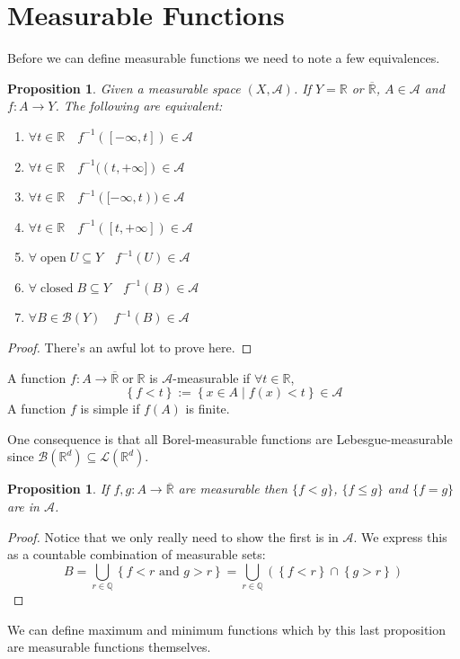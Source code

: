 \documentclass[11pt]{article}
\newcommand{\defeq}{:=}
\newcommand{\relmiddle}[1]{\mathrel{}\middle#1\mathrel{}}
\newcommand{\rmv}{\relmiddle|}
\newcommand{\R}{\mathbb{R}}
\newcommand{\Rb}{\overline{\R}}
\newcommand{\Q}{\mathbb{Q}}
\newenvironment{defin}
	{\begin{mdframed}[backgroundcolor=white, roundcorner=5pt, linewidth=1pt]}
	{\end{mdframed}}
\newcommand{\mdf}[1]{{\color{red} #1}}
\newtheorem{prop}[theorem]{Proposition}
\begin{document}
\section{Measurable Functions}
Before we can define measurable functions we need to note a few equivalences.
\begin{prop}
	Given a measurable space $(X,\mathcal{A})$. If $Y=\R$ or $\Rb$, $A\in\mathcal{A}$ and $f:A\to Y$. The following are equivalent:
	\begin{enumerate}[label=(\alph*)]
		\item $\forall t\in\R\quad f^{-1}([-\infty, t])\in\mathcal{A}$
		\item $\forall t\in\R\quad f^{-1}((t, +\infty])\in\mathcal{A}$
		\item $\forall t\in\R\quad f^{-1}([-\infty, t))\in\mathcal{A}$
		\item $\forall t\in\R\quad f^{-1}([t, +\infty])\in\mathcal{A}$
		\item $\forall\;\text{open}\; U\subseteq Y \quad f^{-1}(U)\in\mathcal{A}$
		\item $\forall\;\text{closed}\; B\subseteq Y \quad f^{-1}(B)\in\mathcal{A}$
		\item $\forall B\in\mathcal{B}(Y)\quad f^{-1}(B)\in\mathcal{A}$
	\end{enumerate}
\end{prop}
\begin{proof}
There's an awful lot to prove here. 
\end{proof}
\begin{defin}
	A function $f:A\to\Rb\;\text{or}\;\R$ is \mdf{$\mathcal{A}$-measurable} if $\forall t\in\R$,
	\[
		\left\{f < t\right\}\defeq\left\{x\in A \rmv f(x)< t\right\}\in\mathcal{A}
	\]
	A function $f$ is \mdf{simple} if $f(A)$ is finite.
\end{defin}
One consequence is that all Borel-measurable functions are Lebesgue-measurable since $\mathcal{B}(\R^d)\subseteq\mathcal{L}(\R^d)$.
\begin{prop}
	If $f,g:A\to\Rb$ are measurable	then $\{f<g\}$, $\{f\leq g\}$ and $\{f=g\}$ are in $\mathcal{A}$.
\end{prop}
\begin{proof}
Notice that we only really need to show the first is in $\mathcal{A}$. We express this as a countable combination of measurable sets:
\[
	B=\bigcup_{r\in\Q}\left\{f<r \text{ and } g>r \right\}=\bigcup_{r\in\Q}\left(\left\{f<r\right\}\cap\left\{g>r\right\}\right)
\]
\end{proof}
We can define maximum and minimum functions which by this last proposition are measurable functions themselves.
\end{document}
